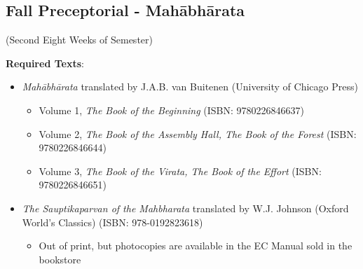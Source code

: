 \documentclass{article}
\newcounter{cntSemester} %
\begin{document}

\clearpage


\begin{center}
	\section{Fall Preceptorial - Mahābhārata}
	 (Second Eight Weeks of Semester)
\end{center}

\textbf{Required Texts}:
\begin{itemize}
	\item \textit{Mahābhārata} translated by J.A.B. van Buitenen (University of Chicago Press)
	      \begin{itemize}
		      \item Volume 1, \textit{The Book of the Beginning} (ISBN: 9780226846637)
		      \item Volume 2, \textit{The Book of the Assembly Hall, The Book of the Forest} (ISBN: 9780226846644)
		      \item Volume 3, \textit{The Book of the Virata, The Book of the Effort} (ISBN: 9780226846651)
	      \end{itemize}
	\item \textit{The Sauptikaparvan of the Mahbharata} translated by W.J. Johnson (Oxford World’s Classics) (ISBN: 978-0192823618)
	      \begin{itemize}
		      \item Out of print, but photocopies are available in the EC Manual sold in the bookstore
	      \end{itemize}
\end{itemize}
\end{document}
